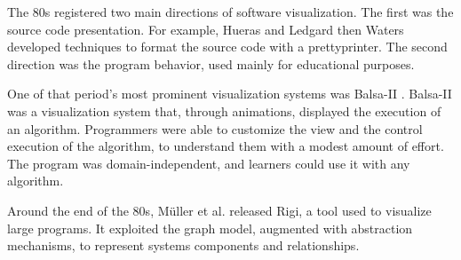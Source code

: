 \bigbreak
The 80s registered two main directions of software visualization. The first was the source code presentation.
For example, Hueras and Ledgard \cite{Hueras1977} then Waters \cite{Waters1983} developed techniques to format the source code with a prettyprinter. 
The second direction was the program behavior, used mainly for educational purposes.
 
\bigbreak
One of that period's most prominent visualization systems was Balsa-II \cite{Brown1988}.
Balsa-II was a visualization system that, through animations, displayed the execution of an algorithm.
Programmers were able to customize the view and the control execution of the algorithm, to understand them with a modest amount of effort. 
The program was domain-independent, and learners could use it with any algorithm. 

\bigbreak
Around the end of the 80s, Müller et al. \cite{Mueller1988} released Rigi, a tool used to visualize large programs.
It exploited the graph model, augmented with abstraction mechanisms, to represent systems components and relationships. 

